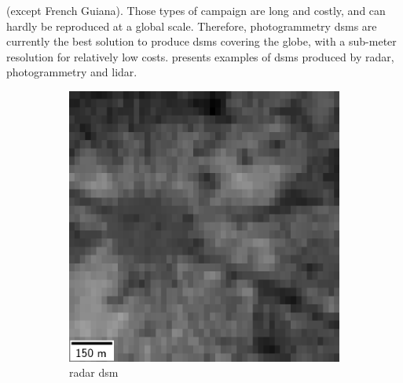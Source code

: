 (except French Guiana). Those types of campaign are long and costly, and can hardly be reproduced at a global scale. Therefore, photogrammetry \acrshort{dsm}s are currently the best solution to produce \acrshort{dsm}s covering the globe, with a sub-meter resolution for relatively low costs.  presents examples of \acrshort{dsm}s produced by \acrshort{radar}, photogrammetry and \acrshort{lidar}.

\begin{figure}
    \begin{subfigure}[t]{0.31\linewidth}
        \flushleft
        \includegraphics[width=\linewidth]{Images/Chap_1/etoile_low_res_dsm.png}
        \caption{\acrshort{radar} \acrshort{dsm}}
        \label{fig:etoile_radar}
    \end{subfigure}\hfill
    \begin{subfigure}[t]{0.31\linewidth}
        \centering

\end{subfigure}
\end{figure}
